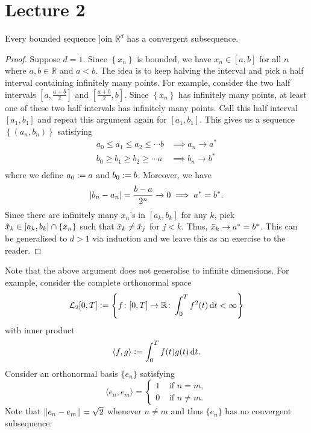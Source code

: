 \section{Lecture 2}

\begin{thm}
    Every bounded sequence ]oin $\mathbb{R}^d$ has a convergent subsequence.
\end{thm}
\begin{proof}
    Suppose $d = 1$. Since $\left\{ x_n \right\}$ is bounded, we have $x_n \in [a,b]$ for all $n$ where $a,b \in \mathbb{R}$ and $a < b$. The idea is to keep halving the interval and pick a half interval containing infinitely many points. For example, consider the two half intervals $[a, \frac{a+b}{2}]$ and $[\frac{a+b}{2}, b]$. Since $\left\{ x_n \right\}$ has infinitely many points, at least one of these two half intervals has infinitely many points. Call this half interval $[a_1, b_1]$ and repeat this argument again for $[a_1, b_1]$. This gives us a sequence $\left\{ (a_n, b_n) \right\}$ satisfying 
    \begin{align*}
        a_0 \leq a_1 \leq a_2 \leq \cdots b &\implies a_n \to a^* \\
        b_0 \geq b_1 \geq b_2 \geq \cdots a &\implies b_n \to b^* \\
    \end{align*}
    where we define $a_0 \vcentcolon= a$ and $b_0 \vcentcolon= b$. Moreover, we have
    \[
        \abs{b_n - a_n} = \frac{b-a}{2^n} \to 0 \implies a^* = b^*.
    \]
    Since there are infinitely many $x_n$'s in $[a_k, b_k]$ for any $k$, pick $\Tilde{x}_k \in [a_k,b_k] \cap \{x_n\}$ such that $\Tilde{x}_k \neq \Tilde{x}_j$ for $j < k$. Thus, $\Tilde{x}_k \to a^* = b^*$. This can be generalised to $d > 1$ via induction and we leave this as an exercise to the reader.
\end{proof}

Note that the above argument does not generalise to infinite dimensions. For example, consider the complete orthonormal space
\[
    \mathcal{L}_2[0,T] \vcentcolon= \left\{ f \colon [0,T] \to \mathbb{R} \colon \int_0^T f^2(t) \, \mathrm{d} t < \infty \right\}
\]
with inner product
\[
    \langle f,g \rangle \vcentcolon= \int_0^T f(t) g(t) \, \mathrm{d} t.
\]
Consider an orthonormal basis $\{e_n\}$ satisfying 
\[
    \langle e_n, e_m \rangle = 
    \begin{cases}
        1 & \text{ if } n = m, \\
        0 & \text{ if } n \neq m.
    \end{cases}
\]
Note that $\norm{e_n - e_m} = \sqrt{2}$ whenever $n \neq m$ and thus $\{e_n\}$ has no convergent subsequence. 

